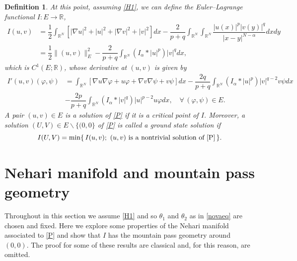 \documentclass[12pt,a4paper]{article}
\newtheorem{definition}[theorem]{Definition}
\numberwithin{equation}{section}
\begin{document}
\begin{definition}\label{def-sol}
At this point, assuming \eqref{H1}, we can define the Euler–Lagrange functional $I: E \rightarrow \mathbb{R}$,
\begin{align}\label{eq1}
I(u,v)& =\dfrac{1}{2}\int_{\mathbb{R}^N} [|\nabla u|^2 +|u|^2 +|\nabla v|^2 +|v|^2] dx - \dfrac{2}{p+q}\int_{\mathbb{R}^N} \int_{\mathbb{R}^N} \dfrac{|u(x)|^p |v(y)|^q}{|x-y|^{N-\alpha}} dx dy \\  \nonumber
& = \dfrac{1}{2}\|(u, v)\|_{E}^{2}- \dfrac{2}{p+q}\int_{\mathbb{R}^N} (I_\alpha \ast |u|^p)|v|^q dx,
\end{align}
which is $C^1(E; \mathbb{R})$, whose derivative at $(u,v)$ is given by
\begin{align}\label{eq2}
I'(u, v)(\varphi, \psi) & = \int_{\mathbb{R}^N} [\nabla u \nabla \varphi + u \varphi + \nabla v \nabla \psi + v \psi ] dx - \dfrac{2q}{p+q}\int_{\mathbb{R}^N} (I_\alpha \ast |u|^p)|v|^{q-2}v \psi dx  \\ \nonumber
& - \dfrac{2p}{p+q}\int_{\mathbb{R}^N} (I_\alpha \ast |v|^q)|u|^{p-2}u \varphi dx, \quad \forall \, (\varphi, \psi) \in E.
\end{align}
A pair $(u,v) \in E$ is a solution of \eqref{P} if it is a critical point of $I$. Moreover, a solution $(U,V) \in E\backslash\{(0,0\}$ of \eqref{P} is called a ground state solution if
\[
I(U,V) = \min\{\,I(u,v); \ (u,v) \ \text{is a nontrivial solution of \eqref{P}}\,\}.
\]
\end{definition}

\section{Nehari manifold and mountain pass geometry}\label{sec-nehari}

Throughout in this section we assume \eqref{H1} and so $\theta_1$ and $\theta_2$ as in \eqref{novaeq} are chosen and fixed. Here we explore some properties of the Nehari manifold associated to \eqref{P} and show that $I$ has the mountain pass geometry around $(0,0)$. The proof for some of these results are classical and, for this reason, are omitted. 
\end{document}
